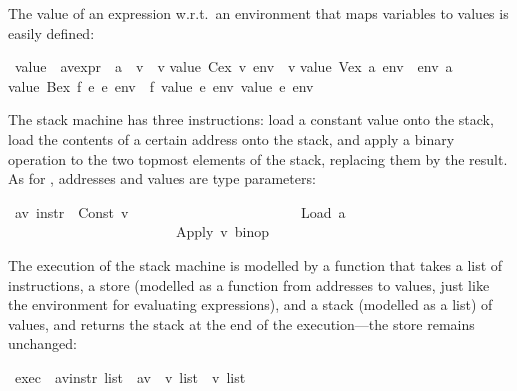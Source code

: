 \begin{isabellebody}
\begin{isamarkuptext}
The value of an expression w.r.t.\ an environment that maps variables to
values is easily defined:%
\end{isamarkuptext}%
\ value\ {\isacharcolon}{\isacharcolon}\ {\isachardoublequote}{\isacharparenleft}{\isacharprime}a{\isacharcomma}{\isacharprime}v{\isacharparenright}expr\ {\isasymRightarrow}\ {\isacharparenleft}{\isacharprime}a\ {\isasymRightarrow}\ {\isacharprime}v{\isacharparenright}\ {\isasymRightarrow}\ {\isacharprime}v{\isachardoublequote}\isanewline
{}\isanewline
{\isachardoublequote}value\ {\isacharparenleft}Cex\ v{\isacharparenright}\ env\ {\isacharequal}\ v{\isachardoublequote}\isanewline
{\isachardoublequote}value\ {\isacharparenleft}Vex\ a{\isacharparenright}\ env\ {\isacharequal}\ env\ a{\isachardoublequote}\isanewline
{\isachardoublequote}value\ {\isacharparenleft}Bex\ f\ e{}\ e{}{\isacharparenright}\ env\ {\isacharequal}\ f\ {\isacharparenleft}value\ e{}\ env{\isacharparenright}\ {\isacharparenleft}value\ e{}\ env{\isacharparenright}{\isachardoublequote}%
\begin{isamarkuptext}%
The stack machine has three instructions: load a constant value onto the
stack, load the contents of a certain address onto the stack, and apply a
binary operation to the two topmost elements of the stack, replacing them by
the result. As for , addresses and values are type parameters:%
\end{isamarkuptext}%
\ {\isacharparenleft}{\isacharprime}a{\isacharcomma}{\isacharprime}v{\isacharparenright}\ instr\ {\isacharequal}\ Const\ {\isacharprime}v\isanewline
\ \ \ \ \ \ \ \ \ \ \ \ \ \ \ \ \ \ \ \ \ \ \ {\isacharbar}\ Load\ {\isacharprime}a\isanewline
\ \ \ \ \ \ \ \ \ \ \ \ \ \ \ \ \ \ \ \ \ \ \ {\isacharbar}\ Apply\ {\isachardoublequote}{\isacharprime}v\ binop{\isachardoublequote}%
\begin{isamarkuptext}%
The execution of the stack machine is modelled by a function
 that takes a list of instructions, a store (modelled as a
function from addresses to values, just like the environment for
evaluating expressions), and a stack (modelled as a list) of values,
and returns the stack at the end of the execution---the store remains
unchanged:%
\end{isamarkuptext}%
\ exec\ {\isacharcolon}{\isacharcolon}\ {\isachardoublequote}{\isacharparenleft}{\isacharprime}a{\isacharcomma}{\isacharprime}v{\isacharparenright}instr\ list\ {\isasymRightarrow}\ {\isacharparenleft}{\isacharprime}a{\isasymRightarrow}{\isacharprime}v{\isacharparenright}\ {\isasymRightarrow}\ {\isacharprime}v\ list\ {\isasymRightarrow}\ {\isacharprime}v\ list{\isachardoublequote}\isanewline

\end{isabellebody}

